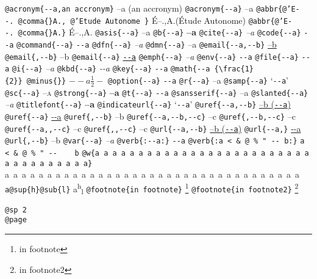 \documentclass{book}
\newcommand\Texinfocommandstyletextcite[1]{{\normalfont{}\textsl{#1}}}%
\newcommand\Texinfocommandstyletextkbd[1]{{\ttfamily\textsl{#1}}}%
\newcommand\Texinfocommandstyletextvar[1]{{\normalfont{}\textsl{#1}}}%
\renewcommand{\_}{\Texinfounderscore\discretionary{}{}{}}
\begin{document}
\begin{titlepage}
\texttt{@acronym\{{-}{-}a,an accronym\}} --a (an accronym)
\texttt{@acronym\{{-}{-}a\}} --a
\texttt{@abbr\{@'E{-}{-}.\ @comma\{\}A.,\ @'Etude Autonome \}} \'{E}--.\@ ,A.\@ (\'{E}tude Autonome)
\texttt{@abbr\{@'E{-}{-}.\ @comma\{\}A.\}} \'{E}--.\@ ,A.\@
\texttt{@asis\{{-}{-}a\}} --a
\texttt{@b\{{-}{-}a\}} \textbf{--a}
\texttt{@cite\{{-}{-}a\}} \Texinfocommandstyletextcite{--a}
\texttt{@code\{{-}{-}a\}} \texttt{{-}{-}a}
\texttt{@command\{{-}{-}a\}} \texttt{{-}{-}a}
\texttt{@dfn\{{-}{-}a\}} \textsl{--a}
\texttt{@dmn\{{-}{-}a\}} \thinspace --a
\texttt{@email\{{-}{-}a,{-}{-}b\}} \href{mailto:--a}{--b}
\texttt{@email\{,{-}{-}b\}} --b
\texttt{@email\{{-}{-}a\}} \href{mailto:--a}{\nolinkurl{--a}}
\texttt{@emph\{{-}{-}a\}} \emph{--a}
\texttt{@env\{{-}{-}a\}} \texttt{{-}{-}a}
\texttt{@file\{{-}{-}a\}} \texttt{{-}{-}a}
\texttt{@i\{{-}{-}a\}} \textit{--a}
\texttt{@kbd\{{-}{-}a\}} \Texinfocommandstyletextkbd{{-}{-}a}
\texttt{@key\{{-}{-}a\}} \texttt{{-}{-}a}
\texttt{@math\{{-}{-}a \{\textbackslash{}frac\{1\}\{2\}\}\ @minus\{\}\}} $--a {\frac{1}{2}} -$
\texttt{@option\{{-}{-}a\}} \texttt{{-}{-}a}
\texttt{@r\{{-}{-}a\}} \textnormal{--a}
\texttt{@samp\{{-}{-}a\}} `\texttt{{-}{-}a}'
\texttt{@sc\{{-}{-}a\}} \textsc{--a}
\texttt{@strong\{{-}{-}a\}} \textbf{--a}
\texttt{@t\{{-}{-}a\}} \texttt{{-}{-}a}
\texttt{@sansserif\{{-}{-}a\}} \textsf{--a}
\texttt{@slanted\{{-}{-}a\}} \textsl{--a}
\texttt{@titlefont\{{-}{-}a\}} {\huge \bfseries --a}
\texttt{@indicateurl\{{-}{-}a\}} `\texttt{{-}{-}a}'
\texttt{@uref\{{-}{-}a,{-}{-}b\}} \href{--a}{--b (\nolinkurl{--a})}
\texttt{@uref\{{-}{-}a\}} \url{--a}
\texttt{@uref\{,{-}{-}b\}} --b
\texttt{@uref\{{-}{-}a,{-}{-}b,{-}{-}c\}} --c
\texttt{@uref\{,{-}{-}b,{-}{-}c\}} --c
\texttt{@uref\{{-}{-}a{,}{,}{-}{-}c\}} --c
\texttt{@uref\{{,}{,}{-}{-}c\}} --c
\texttt{@url\{{-}{-}a,{-}{-}b\}} \href{--a}{--b (\nolinkurl{--a})}
\texttt{@url\{{-}{-}a,\}} \url{--a}
\texttt{@url\{,{-}{-}b\}} --b
\texttt{@var\{{-}{-}a\}} \Texinfocommandstyletextvar{--a}
\texttt{@verb\{:{-}{-}a:\}} \verb:--a:
\texttt{@verb\{:a  < \& @\ \% " {-}{-}    b:\}} \verb:a  < & @ % " --    b:
\texttt{@w\{a a a a a a a a a a a a a a a a a a a a a a a a a a a a a a a a a a a\}} \hbox{a a a a a a a a a a a a a a a a a a a a a a a a a a a a a a a a a a a}
\texttt{a@sup\{h\}@sub\{l\}} a\textsuperscript{h}\textsubscript{l}
\texttt{@footnote\{in footnote\}} \footnote{in footnote}
\texttt{@footnote\{in footnote2\}} \footnote{in footnote2}

\texttt{@sp 2}\leavevmode{}\\
\baselineskip %
\texttt{@page}\leavevmode{}\\
\newpage{}%
\phantom{blabla}%


\end{titlepage}
\end{document}
